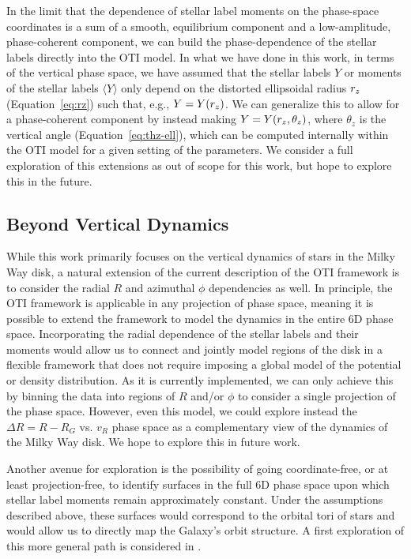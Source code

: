In the limit that the dependence of stellar label moments on the phase-space coordinates
is a sum of a smooth, equilibrium component and a low-amplitude, phase-coherent
component, we can build the phase-dependence of the stellar labels directly into the OTI
model.
In what we have done in this work, in terms of the vertical phase space, we have assumed
that the stellar labels $Y$ or moments of the stellar labels $\langle Y \rangle$ only
depend on the distorted ellipsoidal radius $r_z$ (Equation~\ref{eq:rz}) such that, e.g.,
$Y = Y(r_z)$.
We can generalize this to allow for a phase-coherent component by instead making $Y =
Y(r_z, \theta_z)$, where $\theta_z$ is the vertical angle (Equation~\ref{eq:thz-ell}),
which can be computed internally within the OTI model for a given setting of the
parameters.
We consider a full exploration of this extensions as out of scope for this work, but
hope to explore this in the future.


\subsection{Beyond Vertical Dynamics} \label{sec:disc-beyond-vertical}

While this work primarily focuses on the vertical dynamics of stars in the Milky Way
disk, a natural extension of the current description of the OTI framework is to consider
the radial $R$ and azimuthal $\phi$ dependencies as well.
In principle, the OTI framework is applicable in any projection of phase space, meaning
it is possible to extend the framework to model the dynamics in the entire 6D phase
space.
Incorporating the radial dependence of the stellar labels and their moments would allow
us to connect and jointly model regions of the disk in a flexible framework that does
not require imposing a global model of the potential or density distribution.
As it is currently implemented, we can only achieve this by binning the data into
regions of $R$ and/or $\phi$ to consider a single projection of the phase space.
However, even this model, we could explore instead the $\Delta R = R - R_G$ vs. $v_R$
phase space as a complementary view of the dynamics of the Milky Way disk.
We hope to explore this in future work.

Another avenue for exploration is the possibility of going coordinate-free, or at least
projection-free, to identify surfaces in the full 6D phase space upon which stellar
label moments remain approximately constant.
Under the assumptions described above, these surfaces would correspond to the orbital
tori of stars and would allow us to directly map the Galaxy's orbit structure.
A first exploration of this more general path is considered in \cite{Novara:inprep}.


